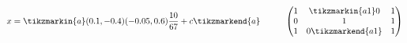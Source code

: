 \documentclass{article}
\begin{document}
\[x= \tikzmarkin{a}(0.1,-0.4)(-0.05,0.6) 
\dfrac{10}{67}+c \tikzmarkend{a} 
\hspace*{1cm}
\begin{pmatrix}
1 & \tikzmarkin{a1}0 & 1\\
0 & 1 & 1\\
1 & 0 \tikzmarkend{a1} & 1
\end{pmatrix}
\]
\end{document}
